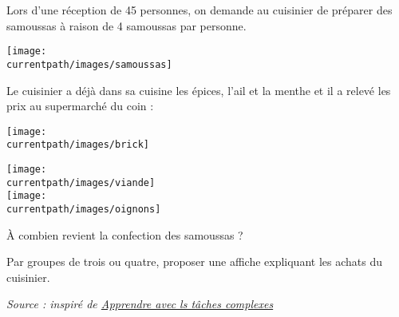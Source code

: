 \begin{enigme}
    \begin{changemargin}{-10mm}{-10mm}
        Lors d'une réception de 45 personnes, on demande au cuisinier de préparer des samoussas à raison de 4 samoussas par personne.
        \begin{center}
           \texttt{[image: \\currentpath/images/samoussas]}
        \end{center}
        Le cuisinier a déjà dans sa cuisine les épices, l'ail et la menthe et il a relevé les prix au supermarché du coin : \\
        \begin{center}
           \parbox{7.5cm}{\texttt{[image: \\currentpath/images/brick]}} \qquad \parbox{8cm}{\texttt{[image: \\currentpath/images/viande]} \\ [3mm]\texttt{[image: \\currentpath/images/oignons]}}
        \end{center}
        \medskip
        \begin{cadre}[B2][F4]
           À combien revient la confection des samoussas ? 
        \end{cadre}
        Par groupes de trois ou quatre, proposer une affiche expliquant les achats du cuisinier.
         
        \vfill\hfill{\it\footnotesize Source : inspiré de \href{https://irem.univ-reunion.fr/IMG/pdf/apprendre_avec_taches_complexes_au_cycle_3.pdf}{Apprendre avec ls tâches complexes}}
    \end{changemargin}
\end{enigme}



